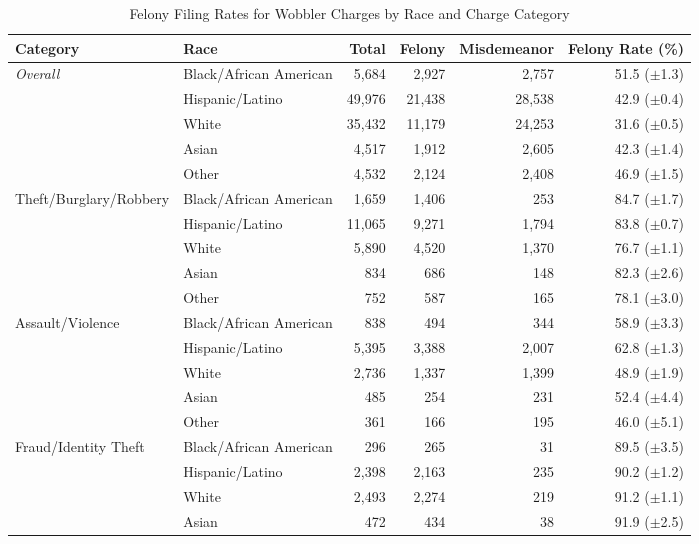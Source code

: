 \begin{table}[htbp]
\centering
\small
\caption{Felony Filing Rates for Wobbler Charges by Race and Charge Category}
\label{tab:wobbler_combined}
\begin{tabular}{ll rrrr}
\toprule
Category & Race & Total & Felony & Misdemeanor & Felony Rate (\%) \\
\midrule
\textit{Overall} & Black/African American & 5,684 & 2,927 & 2,757 & 51.5 ({\scriptsize $\pm$1.3}) \\
 & Hispanic/Latino & 49,976 & 21,438 & 28,538 & 42.9 ({\scriptsize $\pm$0.4}) \\
 & White & 35,432 & 11,179 & 24,253 & 31.6 ({\scriptsize $\pm$0.5}) \\
 & Asian & 4,517 & 1,912 & 2,605 & 42.3 ({\scriptsize $\pm$1.4}) \\
 & Other & 4,532 & 2,124 & 2,408 & 46.9 ({\scriptsize $\pm$1.5}) \\
\addlinespace
\midrule
Theft/Burglary/Robbery & Black/African American & 1,659 & 1,406 & 253 & 84.7 ({\scriptsize $\pm$1.7}) \\
 & Hispanic/Latino & 11,065 & 9,271 & 1,794 & 83.8 ({\scriptsize $\pm$0.7}) \\
 & White & 5,890 & 4,520 & 1,370 & 76.7 ({\scriptsize $\pm$1.1}) \\
 & Asian & 834 & 686 & 148 & 82.3 ({\scriptsize $\pm$2.6}) \\
 & Other & 752 & 587 & 165 & 78.1 ({\scriptsize $\pm$3.0}) \\
\addlinespace
\midrule
Assault/Violence & Black/African American & 838 & 494 & 344 & 58.9 ({\scriptsize $\pm$3.3}) \\
 & Hispanic/Latino & 5,395 & 3,388 & 2,007 & 62.8 ({\scriptsize $\pm$1.3}) \\
 & White & 2,736 & 1,337 & 1,399 & 48.9 ({\scriptsize $\pm$1.9}) \\
 & Asian & 485 & 254 & 231 & 52.4 ({\scriptsize $\pm$4.4}) \\
 & Other & 361 & 166 & 195 & 46.0 ({\scriptsize $\pm$5.1}) \\
\addlinespace
\midrule
Fraud/Identity Theft & Black/African American & 296 & 265 & 31 & 89.5 ({\scriptsize $\pm$3.5}) \\
 & Hispanic/Latino & 2,398 & 2,163 & 235 & 90.2 ({\scriptsize $\pm$1.2}) \\
 & White & 2,493 & 2,274 & 219 & 91.2 ({\scriptsize $\pm$1.1}) \\
 & Asian & 472 & 434 & 38 & 91.9 ({\scriptsize $\pm$2.5}) \\

\end{tabular}
\end{table}
